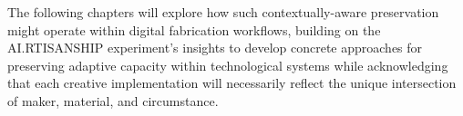 \vspace{0.5cm}

The following chapters will explore how such contextually-aware preservation might operate within digital fabrication workflows, building on the AI.RTISANSHIP experiment's insights to develop concrete approaches for preserving adaptive capacity within technological systems while acknowledging that each creative implementation will necessarily reflect the unique intersection of maker, material, and circumstance.































































